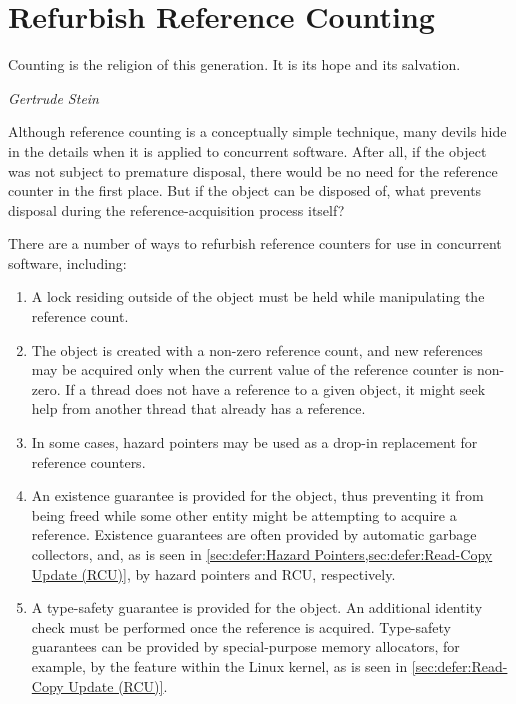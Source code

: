 
\section{Refurbish Reference Counting}
\label{sec:together:Refurbish Reference Counting}
%
\epigraph{Counting is the religion of this generation.
	  It is its hope and its salvation.}
	 {\emph{Gertrude Stein}}

Although reference counting is a conceptually simple technique,
many devils hide in the details when it is applied to concurrent
software.
After all, if the object was not subject to premature disposal,
there would be no need for the reference counter in the first place.
But if the object can be disposed of, what prevents disposal during
the reference-acquisition process itself?

There are a number of ways to refurbish reference counters for
use in concurrent software, including:

\begin{enumerate}
\item	A lock residing outside of the object must be held while
	manipulating the reference count.
\item	The object is created with a non-zero reference count, and new
	references may be acquired only when the current value of
	the reference counter is non-zero.
	If a thread does not have a reference to a given object, it
	might seek help from another thread that already has a reference.
\item	In some cases, hazard pointers may be used as a drop-in
	replacement for reference counters.
\item	An existence guarantee is provided for the object, thus preventing
	it from being freed while some other entity might be attempting
	to acquire a reference.
	Existence guarantees are often provided by automatic
	garbage collectors, and, as is seen in
	\cref{sec:defer:Hazard Pointers,sec:defer:Read-Copy Update (RCU)},
	by hazard pointers and RCU, respectively.
\item	A type-safety guarantee is provided for the object.
	An additional identity check must be performed once
	the reference is acquired.
	Type-safety guarantees can be provided by special-purpose
	memory allocators, for example, by the
	 feature within the Linux kernel,
	as is seen in \cref{sec:defer:Read-Copy Update (RCU)}.
\end{enumerate}

